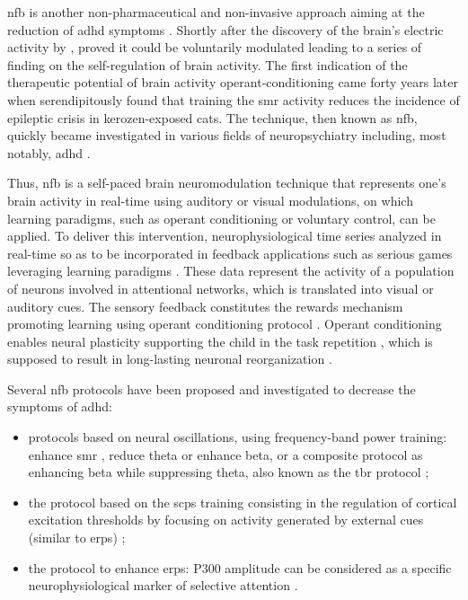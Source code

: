 \gls{nfb} is another non-pharmaceutical and non-invasive approach aiming at the reduction of \gls{adhd} symptoms 
\citep{Arns2015, Steffert2010, Marzbani2016}. Shortly after the discovery of the brain's electric activity by 
\citet{Berger1929}, \citet{Durup1935} proved it could be voluntarily modulated leading to a series of finding on the 
self-regulation of brain activity. The first indication of the therapeutic potential of brain activity operant-conditioning 
came forty years later when \citet{Sterman1974} serendipitously found that training the \gls{smr} activity reduces the incidence 
of epileptic crisis in kerozen-exposed cats. The technique, then known as \gls{nfb}, quickly became investigated in various 
fields of neuropsychiatry including, most notably, \gls{adhd} \citep{Lubar1976, Rossiter1995, Linden1996, Maurizio2014}.

Thus, \gls{nfb} is a self-paced brain neuromodulation technique that represents one's brain activity in real-time using auditory 
or visual modulations, on which learning paradigms, such as operant conditioning
\citep{Reynolds1975} or voluntary control, can be applied. To deliver this intervention, neurophysiological time series 
analyzed in real-time so as to be incorporated in feedback applications such as serious games leveraging learning paradigms \citep{Wang2010}. 
These data represent the activity of a population of neurons involved in attentional networks, which is translated into 
visual or auditory cues. The sensory feedback constitutes the rewards mechanism promoting learning using operant conditioning 
protocol \citep{Sherlin2011}. Operant conditioning enables neural plasticity supporting the child in the task repetition \citep{Skinner1961}, 
which is supposed to result in long-lasting neuronal reorganization \citep{VanDoren2017}. 

Several \gls{nfb} protocols have been proposed and investigated to decrease the symptoms of \gls{adhd}:
\begin{itemize} 
  \item protocols based on neural oscillations, using frequency-band power training: enhance \gls{smr} \citep{Beauregard2006}, reduce theta 
	  or enhance beta, or a composite protocol as enhancing beta while suppressing theta, also known as the \gls{tbr}
    protocol \citep{Lubar1976, Arns2013}; 
  \item the protocol based on the \glspl{scp} training consisting in the regulation of
    cortical excitation thresholds by focusing on activity generated by external cues (similar to \glspl{erp})
    \citep{Heinrich2004, Banaschewski2007}; 
  \item the protocol to enhance \glspl{erp}: P300 amplitude can be considered as a specific
    neurophysiological marker of selective attention \citep{Fouillen2017}.  
\end{itemize} 

